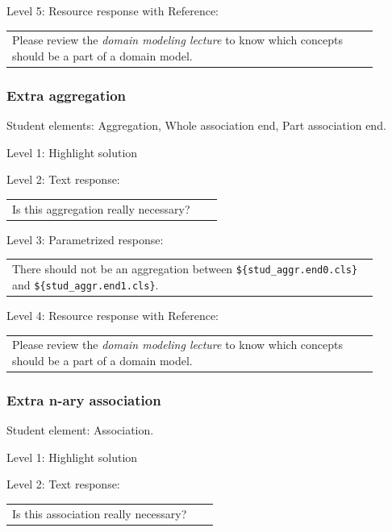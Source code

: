 \noindent Level 5: Resource response with Reference: \medskip

\begin{tabular}{|p{0.9\linewidth}}
Please review the \textit{domain modeling lecture} to know which concepts should be a part of a domain model.
\end{tabular} \medskip


\subsubsection{Extra aggregation}

Student elements: Aggregation, Whole association end, Part association end.  \medskip

\noindent Level 1: Highlight solution  \medskip

\noindent Level 2: Text response: \medskip

\begin{tabular}{|p{0.9\linewidth}}
Is this aggregation really necessary?
\end{tabular} \medskip

\noindent Level 3: Parametrized response: \medskip

\begin{tabular}{|p{0.9\linewidth}}
There should not be an aggregation between \verb|${stud_aggr.end0.cls}| and \verb|${stud_aggr.end1.cls}|.
\end{tabular} \medskip

\noindent Level 4: Resource response with Reference: \medskip

\begin{tabular}{|p{0.9\linewidth}}
Please review the \textit{domain modeling lecture} to know which concepts should be a part of a domain model.
\end{tabular} \medskip


\subsubsection{Extra n-ary association}

Student element: Association.  \medskip

\noindent Level 1: Highlight solution  \medskip

\noindent Level 2: Text response: \medskip

\begin{tabular}{|p{0.9\linewidth}}
Is this association really necessary?
\end{tabular} \medskip

